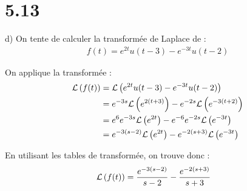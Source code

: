 \section*{5.13}

d) On tente de calculer la transformée de Laplace de :
\begin{align*}
    f(t) = e^{2t}u(t-3) - e^{-3t}u(t-2)
\end{align*}

On applique la transformée :
\begin{align*}
    \mathcal{L}\left({f(t)}\right) &= \mathcal{L}\left({e^{2t}u(t-3) - e^{-3t}u(t-2)}\right) \\
    &= e^{-3s}\mathcal{L}\left({e^{2(t+3)}}\right)-e^{-2s}\mathcal{L}\left({e^{-3(t+2)}}\right) \\
    &= e^{6}e^{-3s}\mathcal{L}\left({e^{2t}}\right)-e^{-6}e^{-2s}\mathcal{L}\left({e^{-3t}}\right) \\
    &= e^{-3(s-2)}\mathcal{L}\left({e^{2t}}\right) - e^{-2(s+3)}\mathcal{L}\left({e^{-3t}}\right)
\end{align*}

En utilisant les tables de transformée, on trouve donc :
\begin{align*}
    \mathcal{L}\left({f(t)}\right) &= \dfrac{e^{-3(s-2)}}{s-2}- \dfrac{e^{-2(s+3)}}{s+3}
\end{align*}
